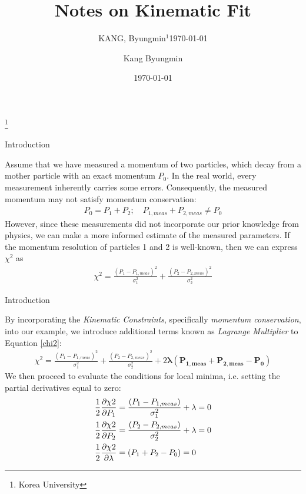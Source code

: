 \documentclass[
	xcolor=dvipsnames,
	10pt, 
	]{beamer}
\title[]{Notes on Kinematic Fit}
\author[Author]{Kang Byungmin}
\institute{Korea University}
\date{\today}
\subtitle{KANG, Byungmin$^1$\newline\today}
\begin{document}
\begin{frame}[t,plain] %
       \titlepage
        \footnote{Korea University}
\end{frame}
\begin{frame}{Introduction}
	\begin{block}{}
	Assume that we have measured a momentum of two particles, which decay from a mother particle with an exact momentum $P_0$. In the real world, every measurement inherently carries some errors. Consequently, the measured momentum may not satisfy momentum conservation:
	\begin{align}
	P_{0}=P_{1}+P_{2};\quad P_{1,meas}+P_{2,meas}\neq P_{0} 
	\end{align}
	However, since these measurements did not incorporate our prior knowledge from physics, we can make a more informed estimate of the measured parameters. If the momentum resolution of particles 1 and 2 is well-known, then we can express $\chi^2$ as
	\begin{align}
		\chi^2= \frac{(P_{1}-P_{1,meas})^2}{\sigma_1^2}+\frac{(P_{2}-P_{2,meas})^2}{\sigma_2^2}\label{chi2}
	\end{align}
	\end{block}
\end{frame}
\begin{frame}{Introduction}
	\begin{block}{}
		By incorporating the \textit{Kinematic Constraints}, specifically \textit{momentum conservation}, into our example, we introduce additional terms known as \textit{Lagrange Multiplier} to Equation \eqref{chi2}:
		\vspace{-5 mm}
		\begin{align}
			\chi^2= \frac{(P_{1}-P_{1,meas})^2}{\sigma_1^2}+\frac{(P_{2}-P_{2,meas})^2}{\sigma_2^2}\label{chi2} + 2\mathbf{\lambda(P_{1,meas}+P_{2,meas}-P_0)}
		\end{align} 
		We then proceed to evaluate the conditions for local minima, i.e. setting the partial derivatives equal to zero:
		\begin{align}
			\frac{1}{2}\frac{\partial \chi2}{\partial P_{1}}&=\frac{(P_{1}-P_{1,meas})}{\sigma_1^2}+\lambda=0\label{dxd1}\\
			\frac{1}{2}\frac{\partial \chi2}{\partial P_{2}}&=\frac{(P_{2}-P_{2,meas})}{\sigma_2^2}+\lambda=0\label{dxd2}
			\\
			\frac{1}{2}\frac{\partial \chi2}{\partial \lambda}&=(P_{1}+P_{2}-P_0)=0\label{dxdl}
		\end{align}
	\end{block}
\end{frame}
\end{document}
